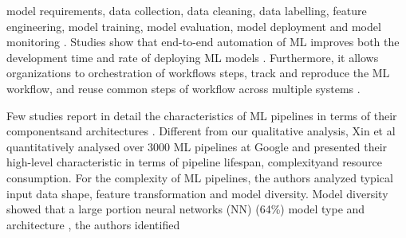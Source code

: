 \DIFdelbegin {}\DIFdelend \DIFaddbegin {}\DIFaddend model requirements, data collection, data cleaning, data labelling, feature engineering, model training, model evaluation, model deployment and model monitoring \cite{Amershi2019}. Studies show that end-to-end automation of ML \DIFdelbegin {}\DIFdelend \DIFaddbegin {}\DIFaddend improves both the development time and rate of deploying ML models \cite{Hummer2019IBM,Doris2021MLPipelines}. Furthermore, it allows organizations to \DIFdelbegin {}\DIFdelend \DIFaddbegin {}\DIFaddend orchestration of workflows steps, \DIFdelbegin {}\DIFdelend track and reproduce the \DIFdelbegin {}\DIFdelend \DIFaddbegin {}\DIFaddend ML workflow, and \DIFdelbegin {}\DIFdelend reuse common steps of \DIFdelbegin {}\DIFdelend \DIFaddbegin {}\DIFaddend workflow across multiple \DIFdelbegin {}\DIFdelend \DIFaddbegin {}\DIFaddend systems \cite{Baylor2017, Hummer2019IBM}. %

Few studies report in detail the characteristics of ML pipelines \DIFdelbegin \DIFdel{, }\DIFdelend in terms of their components\DIFaddbegin \DIFadd{, }\DIFaddend and architectures \cite{Hummer2019IBM,Doris2021MLPipelines}. Different from our qualitative analysis, Xin et al \cite{Doris2021MLPipelines} quantitatively analysed over 3000 ML pipelines at Google and presented their high-level characteristic in terms of pipeline lifespan, complexity\DIFaddbegin \DIFadd{, }\DIFaddend and resource consumption. For the complexity of ML pipelines, the authors analyzed typical input data shape, feature transformation and model diversity. Model diversity showed that a large portion \DIFdelbegin {}\DIFdelend \DIFaddbegin {}\DIFaddend neural networks (NN) (64\%) \DIFdelbegin {}\DIFdelend \DIFaddbegin {}\DIFaddend model type and architecture \DIFdelbegin {}\DIFdelend \DIFaddbegin {}\DIFaddend , the authors \cite{Doris2021MLPipelines} identified \DIFdelbegin {}\DIFdelend \DIFaddbegin {}\DIFaddend 

